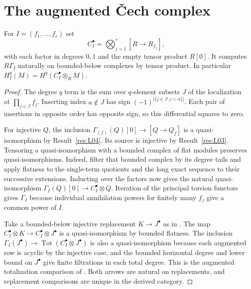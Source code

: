 \section{The augmented \v{C}ech complex}

\begin{theorem}\label{res:L05}
For \(I=(f_1,\ldots,f_r)\) set
\[
 C_I^\bullet=\bigotimes_{j=1}^r [R\longrightarrow R_{f_j}],
\]
with each factor in degrees \(0,1\) and the empty tensor product \(R[0]\).
It computes \(R\Gamma_I\) naturally on bounded-below complexes by tensor
product. In particular \(H_I^q(M)=H^q(C_I^\bullet\otimes_R M)\).
\end{theorem}
\begin{proof}
The degree \(q\) term is the sum over \(q\)-element subsets \(J\) of the
localization at \(\prod_{j\in J}f_j\). Inserting index \(a\notin J\)
has sign \((-1)^{|\{j\in J:j<a\}|}\). Each pair of insertions in opposite
order has opposite sign, so this differential squares to zero.

For injective \(Q\), the inclusion
\(\Gamma_{(f)}(Q)[0]\to [Q\to Q_f]\) is a quasi-isomorphism by
Result~\ref{res:L04}. Its source is injective by Result~\ref{res:L03}.
Tensoring a quasi-isomorphism with a bounded complex of flat modules
preserves quasi-isomorphisms. Indeed, filter that bounded complex by
its degree tails and apply flatness to the single-term quotients
and the long exact sequence to their successive extensions.
Inducting over the factors now gives the natural quasi-isomorphism
\(\Gamma_I(Q)[0]\to C_I^\bullet\otimes Q\). Iteration of the principal
torsion functors gives \(\Gamma_I\) because individual annihilation
powers for finitely many \(f_j\) give a common power of \(I\).

Take a bounded-below injective replacement \(K\to J^\bullet\) as in
\cite[R01, R03 and R06]{homological}. The map
\(C_I^\bullet\otimes K\to C_I^\bullet\otimes J^\bullet\) is a
quasi-isomorphism by bounded flatness. The inclusion
\(\Gamma_I(J^\bullet)\to\operatorname{Tot}(C_I^\bullet\otimes J^\bullet)\)
is also a quasi-isomorphism because each augmented row is acyclic by the
injective case, and the bounded horizontal degree and lower bound
on \(J^\bullet\) give finite filtrations in each total degree.
This is the augmented totalization comparison of
\cite[B01--B04]{homological}. Both arrows are natural on replacements,
and replacement comparisons are unique in the derived category.
\end{proof}

